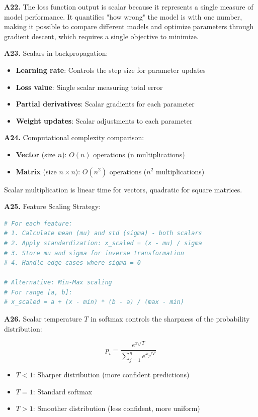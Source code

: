 \documentclass[11pt,a4paper]{article}
\begin{document}
\textbf{A22.} The loss function output is scalar because it represents a single measure of model performance. It quantifies "how wrong" the model is with one number, making it possible to compare different models and optimize parameters through gradient descent, which requires a single objective to minimize.

\textbf{A23.} Scalars in backpropagation:
\begin{itemize}
    \item \textbf{Learning rate}: Controls the step size for parameter updates
    \item \textbf{Loss value}: Single scalar measuring total error
    \item \textbf{Partial derivatives}: Scalar gradients for each parameter
    \item \textbf{Weight updates}: Scalar adjustments to each parameter
\end{itemize}

\textbf{A24.} Computational complexity comparison:
\begin{itemize}
    \item \textbf{Vector} (size $n$): $O(n)$ operations (n multiplications)
    \item \textbf{Matrix} (size $n \times n$): $O(n^2)$ operations ($n^2$ multiplications)
\end{itemize}

Scalar multiplication is linear time for vectors, quadratic for square matrices.

\textbf{A25.} Feature Scaling Strategy:

\begin{lstlisting}[language=Python]
# For each feature:
# 1. Calculate mean (mu) and std (sigma) - both scalars
# 2. Apply standardization: x_scaled = (x - mu) / sigma
# 3. Store mu and sigma for inverse transformation
# 4. Handle edge cases where sigma = 0

# Alternative: Min-Max scaling
# For range [a, b]:
# x_scaled = a + (x - min) * (b - a) / (max - min)
\end{lstlisting}

\textbf{A26.} Scalar temperature $T$ in softmax controls the sharpness of the probability distribution:

\begin{equation*}
    p_i = \frac{e^{x_i/T}}{\sum_{j=1}^{n} e^{x_j/T}}
\end{equation*}

\begin{itemize}
    \item $T < 1$: Sharper distribution (more confident predictions)
    \item $T = 1$: Standard softmax
    \item $T > 1$: Smoother distribution (less confident, more uniform)
\end{itemize}
\end{document}
